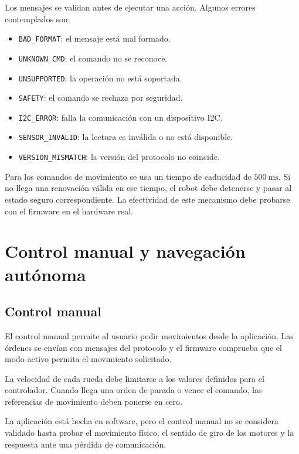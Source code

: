 \documentclass[journal]{IEEEtran}
\begin{document}
Los mensajes se validan antes de ejecutar una acción. Algunos errores contemplados son:

\begin{itemize}
    \item \texttt{BAD\_FORMAT}: el mensaje está mal formado.
    \item \texttt{UNKNOWN\_CMD}: el comando no se reconoce.
    \item \texttt{UNSUPPORTED}: la operación no está soportada.
    \item \texttt{SAFETY}: el comando se rechaza por seguridad.
    \item \texttt{I2C\_ERROR}: falla la comunicación con un dispositivo I2C.
    \item \texttt{SENSOR\_INVALID}: la lectura es inválida o no está disponible.
    \item \texttt{VERSION\_MISMATCH}: la versión del protocolo no coincide.
\end{itemize}

Para los comandos de movimiento se usa un tiempo de caducidad de $500~\mathrm{ms}$. Si no llega una renovación válida en ese tiempo, el robot debe detenerse y pasar al estado seguro correspondiente. La efectividad de este mecanismo debe probarse con el firmware en el hardware real.


\section{Control manual y navegación autónoma}

\subsection{Control manual}

El control manual permite al usuario pedir movimientos desde la aplicación. Las órdenes se envían con mensajes del protocolo y el firmware comprueba que el modo activo permita el movimiento solicitado.

La velocidad de cada rueda debe limitarse a los valores definidos para el controlador. Cuando llega una orden de parada o vence el comando, las referencias de movimiento deben ponerse en cero.

La aplicación está hecha en software, pero el control manual no se considera validado hasta probar el movimiento físico, el sentido de giro de los motores y la respuesta ante una pérdida de comunicación.
\end{document}
